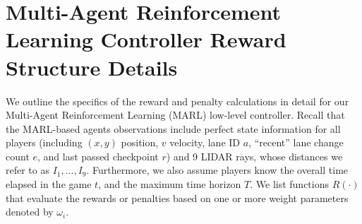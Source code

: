\chapter{Multi-Agent Reinforcement Learning Controller Reward Structure Details} \label{app:rl_details}
We outline the specifics of the reward and penalty calculations in detail for our Multi-Agent Reinforcement Learning (MARL) low-level controller. Recall that the MARL-based agents observations include perfect state information for all players (including $(x, y)$ position, $v$ velocity, lane ID $a$, ``recent'' lane change count $e$, and last passed checkpoint $r$) and 9 LIDAR rays, whose distances we refer to as $I_1, \ldots, I_9$. Furthermore, we also assume players know the overall time elapsed in the game $t$, and the maximum time horizon $T$. We list functions $R(\cdot)$ that evaluate the rewards or penalties based on one or more weight parameters denoted by $\omega_i$. 

